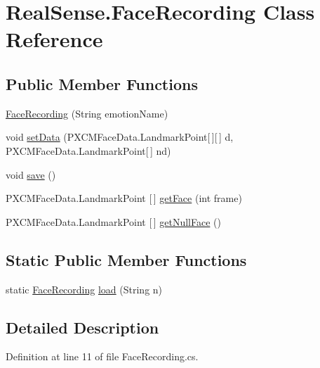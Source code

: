 \hypertarget{class_real_sense_1_1_face_recording}{}\section{Real\+Sense.\+Face\+Recording Class Reference}
\label{class_real_sense_1_1_face_recording}
\subsection*{Public Member Functions}
\begin{DoxyCompactItemize}
\item 
\hyperlink{class_real_sense_1_1_face_recording_a06fe1ad41d77cd359dd583c70d1f6e35}{Face\+Recording} (String emotion\+Name)
\item 
void \hyperlink{class_real_sense_1_1_face_recording_a94e9208ed4f1fe15264ab3b2293f3ce4}{set\+Data} (P\+X\+C\+M\+Face\+Data.\+Landmark\+Point\mbox{[}$\,$\mbox{]}\mbox{[}$\,$\mbox{]} d, P\+X\+C\+M\+Face\+Data.\+Landmark\+Point\mbox{[}$\,$\mbox{]} nd)
\item 
void \hyperlink{class_real_sense_1_1_face_recording_aab0ad08e511ae94dbabe32a483a395ca}{save} ()
\item 
P\+X\+C\+M\+Face\+Data.\+Landmark\+Point \mbox{[}$\,$\mbox{]} \hyperlink{class_real_sense_1_1_face_recording_a8a5e0b5187f8f71e490c612289df757f}{get\+Face} (int frame)
\item 
P\+X\+C\+M\+Face\+Data.\+Landmark\+Point \mbox{[}$\,$\mbox{]} \hyperlink{class_real_sense_1_1_face_recording_adb306111dec190d5852088978ea2459e}{get\+Null\+Face} ()
\end{DoxyCompactItemize}
\subsection*{Static Public Member Functions}
\begin{DoxyCompactItemize}
\item 
static \hyperlink{class_real_sense_1_1_face_recording}{Face\+Recording} \hyperlink{class_real_sense_1_1_face_recording_a61d844c987701d6a21c0ce83333bdf14}{load} (String n)
\end{DoxyCompactItemize}


\subsection{Detailed Description}


Definition at line 11 of file Face\+Recording.\+cs.



